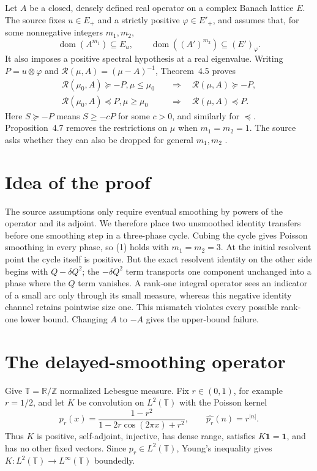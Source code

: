\documentclass[11pt]{article}
\theoremstyle{remark}
\newcommand{\T}{\mathbb T}
\newcommand{\one}{\mathbf 1}
\newcommand{\R}{\mathcal R}
\newcommand{\dom}{\operatorname{dom}}
\begin{document}
Let $A$ be a closed, densely defined real operator on a complex Banach
lattice $E$.  The source fixes $u\in E_+$ and a strictly positive
$\varphi\in E'_+$, and assumes that, for some nonnegative integers $m_1,m_2$,
\[
 \dom(A^{m_1})\subseteq E_u,
 \qquad
 \dom((A')^{m_2})\subseteq (E')_\varphi.                 \tag{1}
\]
It also imposes a positive spectral hypothesis at a real eigenvalue.
Writing $P=u\otimes\varphi$ and
$\R(\mu,A)=(\mu-A)^{-1}$, Theorem~4.5 proves
\begin{align*}
 \R(\mu_0,A)\succeq-P, \mu\leq\mu_0
     &\quad\Longrightarrow\quad \R(\mu,A)\succeq-P,\\
 \R(\mu_0,A)\preceq P, \mu\geq\mu_0
     &\quad\Longrightarrow\quad \R(\mu,A)\preceq P.
                                                               \tag{2}
\end{align*}
Here $S\succeq-P$ means $S\geq-cP$ for some $c>0$, and similarly
for $\preceq$.  Proposition~4.7 removes the restrictions on $\mu$ when
$m_1=m_2=1$.  The source asks whether they can also be dropped for general
$m_1,m_2$ \cite[p.~15]{AG}.

\section*{Idea of the proof}

The source assumptions only require eventual smoothing by powers of the
operator and its adjoint.  We therefore place two unsmoothed identity
transfers before one smoothing step in a three-phase cycle.  Cubing the cycle
gives Poisson smoothing in every phase, so (1) holds with $m_1=m_2=3$.
At the initial resolvent point the cycle itself is positive.  But the exact
resolvent identity on the other side begins with $Q-\delta Q^2$; the
$-\delta Q^2$ term transports one component unchanged into a phase where the
$Q$ term vanishes.  A rank-one integral operator sees an indicator of a small
arc only through its small measure, whereas this negative identity channel
retains pointwise size one.  This mismatch violates every possible rank-one
lower bound.  Changing $A$ to $-A$ gives the upper-bound failure.

\section{The delayed-smoothing operator}

Give $\T=\mathbb R/\mathbb Z$ normalized Lebesgue measure.  Fix
$r\in(0,1)$, for example $r=1/2$, and let $K$ be convolution on $L^2(\T)$
with the Poisson kernel
\[
 p_r(x)=\frac{1-r^2}{1-2r\cos(2\pi x)+r^2},
 \qquad \widehat{p_r}(n)=r^{|n|}.                            \tag{3}
\]
Thus $K$ is positive, self-adjoint, injective, has dense range, satisfies
$K\one=\one$, and has no other fixed vectors.  Since $p_r\in L^2(\T)$,
Young's inequality gives $K:L^2(\T)\to L^\infty(\T)$ boundedly.
\end{document}
